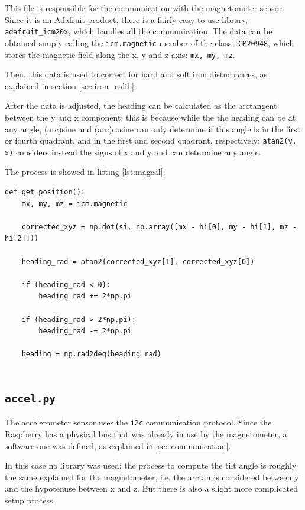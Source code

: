 \documentclass[]{article}
\begin{document}
This file is responsible for the communication with the magnetometer sensor. Since it is an Adafruit product, there is a fairly easy to use library, \texttt{adafruit\_icm20x}, which handles all the communication. The data can be obtained simply calling the \texttt{icm.magnetic} member of the class \texttt{ICM20948}, which stores the magnetic field along the x, y and z axis: \texttt{mx, my, mz}. 

Then, this data is used to correct for hard and soft iron disturbances, as explained in section \ref{sec:iron_calib}. 

After the data is adjusted, the heading can be calculated as the arctangent between the y and x component: this is because while the the heading can be at any angle, (arc)sine and (arc)cosine can only determine if this angle is in the first or fourth quadrant, and in the first and second quadrant, respectively; \texttt{atan2(y, x)} considers instead the signs of x and y and can determine any angle. 

The process is showed in listing \ref{lst:magcal}.

\begin{lstlisting}[language=PythonPlus, label={lst:magcal}, caption={The magnetic field is read from the sensor, the calibration parameters are applied and the heading is computed.}]
def get_position():
	mx, my, mz = icm.magnetic

	corrected_xyz = np.dot(si, np.array([mx - hi[0], my - hi[1], mz - hi[2]]))
	
	heading_rad = atan2(corrected_xyz[1], corrected_xyz[0])
	
	if (heading_rad < 0):
		heading_rad += 2*np.pi
	
	if (heading_rad > 2*np.pi):
		heading_rad -= 2*np.pi
	
	heading = np.rad2deg(heading_rad)
	
\end{lstlisting}

\subsection{\texttt{accel.py}}
The accelerometer sensor uses the \texttt{i2c} communication protocol. Since the Raspberry has a physical bus that was already in use by the magnetometer, 
a software one was defined, as explained in \ref{sec:communication}.

In this case no library was used; the process to compute the tilt angle is roughly the same explained for the magnetometer, i.e. the arctan is considered between y and the hypotenuse between x and z. But there is also a slight more complicated setup process. 
\end{document}
